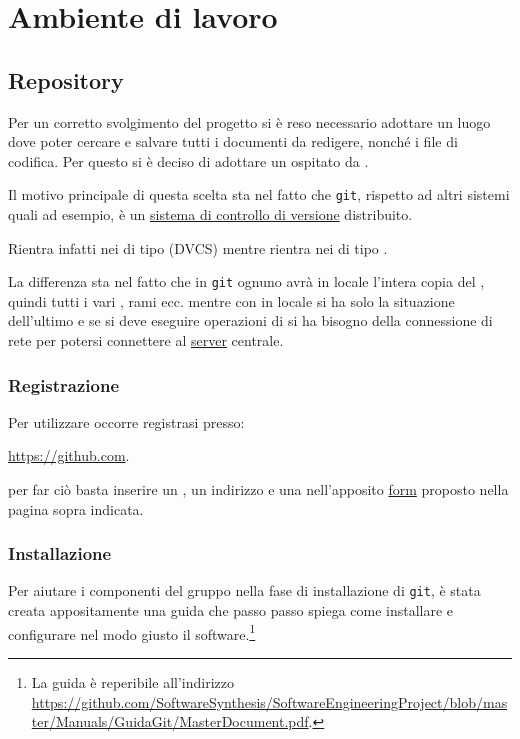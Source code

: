 \clearpage
\section{Ambiente di lavoro}
\subsection{Repository}
\label{sec:repository}
Per un corretto svolgimento del progetto si è reso necessario adottare un luogo dove poter cercare e salvare tutti i documenti da redigere, nonché i file di codifica. Per questo si è deciso di adottare un \underline{} ospitato da .

Il motivo principale di questa scelta sta nel fatto che \texttt{git}, rispetto ad altri sistemi quali  ad esempio, è un \underline{sistema di controllo di versione} distribuito.

Rientra infatti nei  di tipo  (DVCS) mentre  rientra nei  di tipo .

La differenza sta nel fatto che in \texttt{git} ognuno avrà in locale l'intera copia del , quindi tutti i vari , rami ecc. mentre con  in locale si ha solo la situazione dell'ultimo  e se si deve eseguire operazioni di  si ha bisogno della connessione di rete per potersi connettere al \underline{server} centrale.

\subsubsection{Registrazione}
Per utilizzare  occorre registrasi presso:
\begin{center}
\url{https://github.com}.
\end{center}
per far ciò basta inserire un , un indirizzo  e una  nell'apposito \underline{form} proposto nella pagina sopra indicata.

\subsubsection{Installazione}
Per aiutare i componenti del gruppo nella fase di installazione di \texttt{git}, è stata creata appositamente una guida che passo passo spiega come installare e configurare nel modo giusto il software.\footnote{%
La guida è reperibile all'indirizzo 
\url{https://github.com/SoftwareSynthesis/SoftwareEngineeringProject/blob/master/Manuals/GuidaGit/MasterDocument.pdf}.
}

